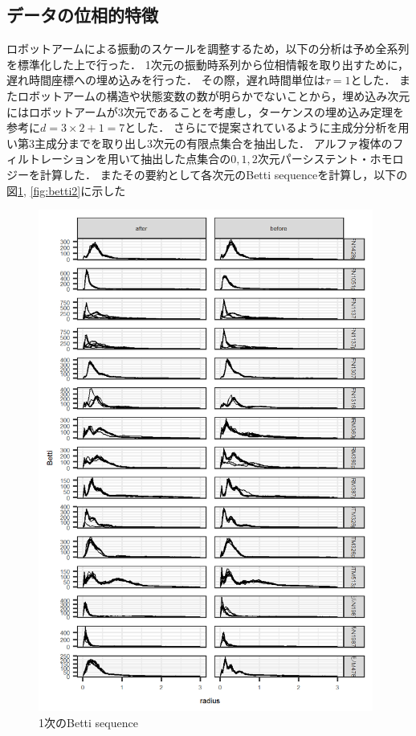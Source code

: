 \documentclass{jarticle}
\begin{document}
\subsection{データの位相的特徴}
ロボットアームによる振動のスケールを調整するため，以下の分析は予め全系列を標準化した上で行った．
1次元の振動時系列から位相情報を取り出すために，遅れ時間座標への埋め込みを行った．
その際，遅れ時間単位は$\tau = 1$とした．
またロボットアームの構造や状態変数の数が明らかでないことから，埋め込み次元にはロボットアームが3次元であることを考慮し，ターケンスの埋め込み定理を参考に$d = 3\times2 + 1 = 7$とした．
さらに\cite{Truong2017}で提案されているように主成分分析を用い第3主成分までを取り出し3次元の有限点集合を抽出した．
アルファ複体のフィルトレーションを用いて抽出した点集合の$0,1,2$次元パーシステント・ホモロジーを計算した．
またその要約として各次元のBetti sequenceを計算し，以下の図\ref{fig:betti1}, \ref{fig:betti2}に示した

\begin{figure}[htbp]
\begin{center}
	\includegraphics[width=11cm]{fig/betti_1.png}	
	\caption{1次のBetti sequence}\label{fig:betti1}
\end{center}
\end{figure}
\end{document}

